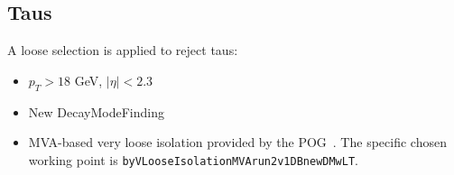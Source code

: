 \subsection{Taus}
\label{subsec:taus}

A loose selection is applied to reject taus:
\begin{itemize}
  \item $p_T > 18$ GeV, $|\eta| < 2.3$
  \item New DecayModeFinding
  \item MVA-based very loose isolation provided by the POG~\cite{CMS-TAU-TWIKI-ISO}. The specific chosen working point is \verb|byVLooseIsolationMVArun2v1DBnewDMwLT|.
\end{itemize}
